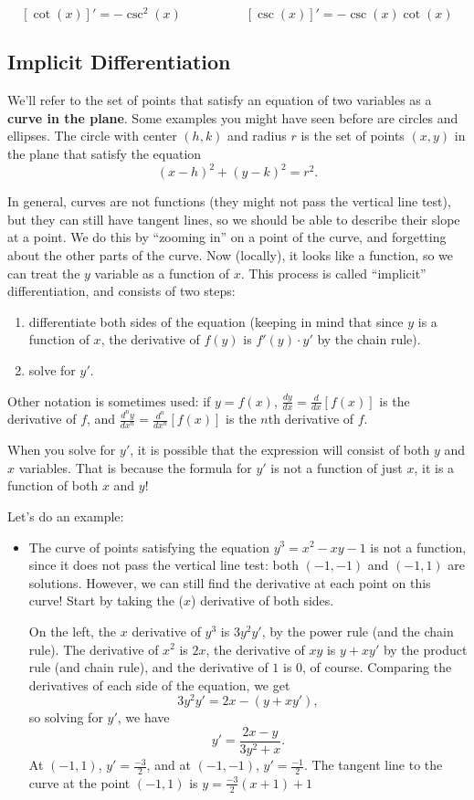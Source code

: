 $$[\cot(x)]' = -\csc^2(x)
\quad\quad\quad\quad\quad
[\csc(x)]' = -\csc(x)\cot(x)$$


\subsection{Implicit Differentiation}

We'll refer to the set of points that satisfy an equation of two variables as a \textbf{curve in the plane}. Some examples you might have seen before are circles and ellipses. The circle with center $(h,k)$ and radius $r$ is the set of points $(x,y)$ in the plane that satisfy the equation
$$(x-h)^2+(y-k)^2=r^2.$$

In general, curves are not functions (they might not pass the vertical line test), but they can still have tangent lines, so we should be able to describe their slope at a point. We do this by ``zooming in'' on a point of the curve, and forgetting about the other parts of the curve. Now (locally), it looks like a function, so we can treat the $y$ variable as a function of $x$. This process is called ``implicit'' differentiation, and consists of two steps:
\begin{enumerate}
\item differentiate both sides of the equation (keeping in mind that since $y$ is a function of $x$, the derivative of $f(y)$ is $f'(y)\cdot y'$ by the chain rule).
\item solve for $y'$.
\end{enumerate}

Other notation is sometimes used: if $y=f(x)$, $\frac{dy}{dx}=\frac{d}{dx}[f(x)]$ is the derivative of $f$, and $\frac{d^ny}{dx^n}=\frac{d^n}{dx^n}[f(x)]$ is the $n$th derivative of $f$.

When you solve for $y'$, it is possible that the expression will consist of both $y$ and $x$ variables. That is because the formula for $y'$ is not a function of just $x$, it is a function of both $x$ and $y$!

Let's do an example:
\begin{itemize}
\item The curve of points satisfying the equation $y^{3}=x^{2}-xy-1$ is not a function, since it does not pass the vertical line test: both $(-1,-1)$ and $(-1,1)$ are solutions. However, we can still find the derivative at each point on this curve! Start by taking the ($x$) derivative of both sides.

On the left, the $x$ derivative of $y^3$ is $3y^2y'$, by the power rule (and the chain rule). The derivative of $x^2$ is $2x$, the derivative of $xy$ is $y+xy'$ by the product rule (and chain rule), and the derivative of $1$ is 0, of course. Comparing the derivatives of each side of the equation, we get
$$3y^2y'=2x-(y+xy'),$$
so solving for $y'$, we have
$$y'=\frac{2x-y}{3y^2+x}.$$
At $(-1,1)$, $y'=\frac{-3}{2}$, and at $(-1,-1)$, $y'=\frac{-1}{2}$. The tangent line to the curve at the point $(-1,1)$ is $y=\frac{-3}{2}(x+1)+1$

\end{itemize}

